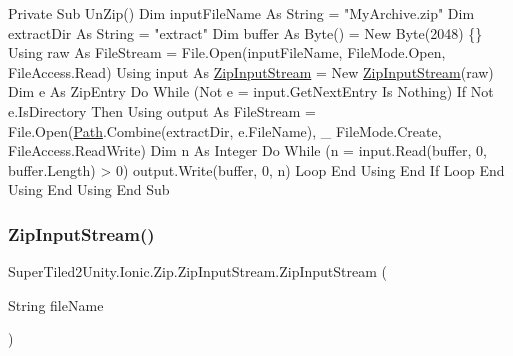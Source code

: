\begin{DoxyCode}
Private Sub UnZip()
    Dim inputFileName As String = "MyArchive.zip"
    Dim extractDir As String = "extract"
    Dim buffer As Byte() = New Byte(2048) \{\}
    Using raw As FileStream = File.Open(inputFileName, FileMode.Open, FileAccess.Read)
        Using input As \mbox{\hyperlink{class_super_tiled2_unity_1_1_ionic_1_1_zip_1_1_zip_input_stream_af9203130f058abb23317725bcb98c047}{ZipInputStream}} = New \mbox{\hyperlink{class_super_tiled2_unity_1_1_ionic_1_1_zip_1_1_zip_input_stream_af9203130f058abb23317725bcb98c047}{ZipInputStream}}(raw)
            Dim e As ZipEntry
            Do While (Not e = input.GetNextEntry Is Nothing)
                If Not e.IsDirectory Then
                    Using output As FileStream = File.Open(\mbox{\hyperlink{namespace_path}{Path}}.Combine(extractDir, e.FileName), \_
                                                           FileMode.Create, FileAccess.ReadWrite)
                        Dim n As Integer
                        Do While (n = input.Read(buffer, 0, buffer.Length) > 0)
                            output.Write(buffer, 0, n)
                        Loop
                    End Using
                End If
            Loop
        End Using
    End Using
End Sub
\end{DoxyCode}
 \mbox{\label{class_super_tiled2_unity_1_1_ionic_1_1_zip_1_1_zip_input_stream_ab8638e5453c2c32e3007ca7978949f94}} 
\subsubsection{\texorpdfstring{Zip\+Input\+Stream()}{ZipInputStream()}\hspace{0.1cm}{\footnotesize\ttfamily [2/3]}}
{\footnotesize\ttfamily Super\+Tiled2\+Unity.\+Ionic.\+Zip.\+Zip\+Input\+Stream.\+Zip\+Input\+Stream (\begin{DoxyParamCaption}\item[{String}]{file\+Name }\end{DoxyParamCaption})}



